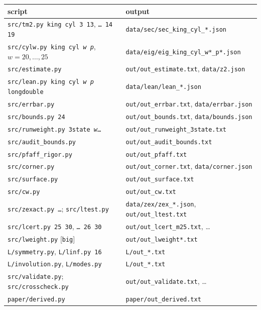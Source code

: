 \documentclass[11pt]{amsart}
\theoremstyle{definition}
\theoremstyle{remark}
\newcommand{\file}[1]{\texttt{#1}}
\begin{document}
\begin{center}\small
\begin{tabular}{ll}
\toprule
script & output \\
\midrule
\texttt{src/tm2.py king cyl 3 13}, \texttt{\dots\ 14 19} & \file{data/sec/sec\_king\_cyl\_*.json} \\
\texttt{src/cylw.py king cyl \textit{w} \textit{p}}, $w = 20, \dots, 25$ & \file{data/eig/eig\_king\_cyl\_w*\_p*.json} \\
\texttt{src/estimate.py} & \file{out/out\_estimate.txt}, \file{data/z2.json} \\
\texttt{src/lean.py king cyl \textit{w} \textit{p} longdouble} & \file{data/lean/lean\_*.json} \\
\texttt{src/errbar.py} & \file{out/out\_errbar.txt}, \file{data/errbar.json} \\
\texttt{src/bounds.py 24} & \file{out/out\_bounds.txt}, \file{data/bounds.json} \\
\texttt{src/runweight.py 3state \textit{w}\dots} & \file{out/out\_runweight\_3state.txt} \\
\texttt{src/audit\_bounds.py} & \file{out/out\_audit\_bounds.txt} \\
\texttt{src/pfaff\_rigor.py} & \file{out/out\_pfaff.txt} \\
\texttt{src/corner.py} & \file{out/out\_corner.txt}, \file{data/corner.json} \\
\texttt{src/surface.py} & \file{out/out\_surface.txt} \\
\texttt{src/cw.py} & \file{out/out\_cw.txt} \\
\texttt{src/zexact.py \dots}; \texttt{src/ltest.py} & \file{data/zex/zex\_*.json}, \file{out/out\_ltest.txt} \\
\texttt{src/lcert.py 25 30}, \texttt{\dots\ 26 30} & \file{out/out\_lcert\_m25.txt}, \dots \\
\texttt{src/lweight.py} [\texttt{big}] & \file{out/out\_lweight*.txt} \\
\texttt{L/symmetry.py}, \texttt{L/linf.py 16} & \file{L/out\_*.txt} \\
\texttt{L/involution.py}, \texttt{L/modes.py} & \file{L/out\_*.txt} \\
\texttt{src/validate.py}; \texttt{src/crosscheck.py} & \file{out/out\_validate.txt}, \dots \\
\texttt{paper/derived.py} & \file{paper/out\_derived.txt} \\
\bottomrule
\end{tabular}
\end{center}
\end{document}
